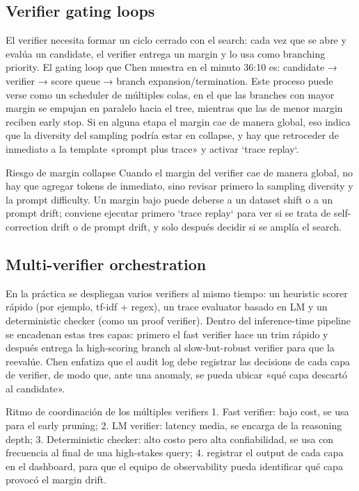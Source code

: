\subsection{Verifier gating loops}
El verifier necesita formar un ciclo cerrado con el search: cada vez que se abre y evalúa un candidate, el verifier entrega un margin y lo usa como branching priority. El gating loop que Chen muestra en el minuto 36:10 es: candidate → verifier → score queue → branch expansion/termination. Este proceso puede verse como un scheduler de múltiples colas, en el que las branches con mayor margin se empujan en paralelo hacia el tree, mientras que las de menor margin reciben early stop. Si en alguna etapa el margin cae de manera global, eso indica que la diversity del sampling podría estar en collapse, y hay que retroceder de inmediato a la template «prompt plus trace» y activar `trace replay`.

\begin{warningbox}{Riesgo de margin collapse}
Cuando el margin del verifier cae de manera global, no hay que agregar tokens de inmediato, sino revisar primero la sampling diversity y la prompt difficulty. Un margin bajo puede deberse a un dataset shift o a un prompt drift; conviene ejecutar primero `trace replay` para ver si se trata de self-correction drift o de prompt drift, y solo después decidir si se amplía el search.
\end{warningbox}

\subsection{Multi-verifier orchestration}
En la práctica se despliegan varios verifiers al mismo tiempo: un heuristic scorer rápido (por ejemplo, tf-idf + regex), un trace evaluator basado en LM y un deterministic checker (como un proof verifier). Dentro del inference-time pipeline se encadenan estas tres capas: primero el fast verifier hace un trim rápido y después entrega la high-scoring branch al slow-but-robust verifier para que la reevalúe. Chen enfatiza que el audit log debe registrar las decisions de cada capa de verifier, de modo que, ante una anomaly, se pueda ubicar «qué capa descartó al candidate».

\begin{knowledgebox}{Ritmo de coordinación de los múltiples verifiers}
1. Fast verifier: bajo cost, se usa para el early pruning; 2. LM verifier: latency media, se encarga de la reasoning depth; 3. Deterministic checker: alto costo pero alta confiabilidad, se usa con frecuencia al final de una high-stakes query; 4. registrar el output de cada capa en el dashboard, para que el equipo de observability pueda identificar qué capa provocó el margin drift.
\end{knowledgebox}

